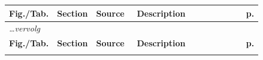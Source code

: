 \renewcommand{\arraystretch}{1.5}
\raggedbottom
\begin{longtable}{|p{0.05\linewidth}|p{0.14\linewidth}|p{0.16\linewidth}|p{0.43\linewidth}|p{0.06\linewidth}|}

\hline
\textcolor{textprimary}{\small\bfseries\sffamily Fig./Tab.} &
\textcolor{textprimary}{\small\bfseries\sffamily Section} &
\textcolor{textprimary}{\small\bfseries\sffamily Source} &
\textcolor{textprimary}{\small\bfseries\sffamily Description} &
\textcolor{textprimary}{\small\bfseries\sffamily p.} \\
\hline\hline
\endfirsthead

\hline
\multicolumn{5}{|l|}{\textcolor{textmuted}{\small\itshape \ldots vervolg}} \\
\hline
\textcolor{textprimary}{\small\bfseries\sffamily Fig./Tab.} &
\textcolor{textprimary}{\small\bfseries\sffamily Section} &
\textcolor{textprimary}{\small\bfseries\sffamily Source} &
\textcolor{textprimary}{\small\bfseries\sffamily Description} &
\textcolor{textprimary}{\small\bfseries\sffamily p.} \\
\hline\hline
\endhead

\hline
\endlastfoot


\end{longtable}
